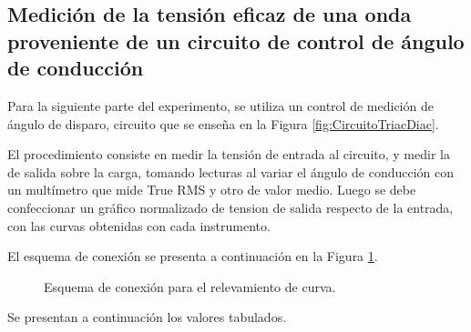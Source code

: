   \subsection{Medición de la tensión eficaz de una onda proveniente de un circuito de control de ángulo de conducción}
Para la siguiente parte del experimento, se utiliza un control de medición 
de ángulo de disparo, circuito que se enseña en la Figura \ref{fig:CircuitoTriacDiac}.



El procedimiento consiste en medir la tensión de entrada al circuito, 
y medir la de salida sobre la carga, tomando lecturas
al variar el ángulo de conducción con un multímetro que mide True RMS y otro de valor medio. 
Luego se debe confeccionar un gráfico normalizado de tension de salida 
respecto de la entrada, con las curvas obtenidas con cada instrumento.

El esquema de conexión se presenta a continuación en la Figura \ref{fig:EsquemaConexionTriac}.

\begin{figure}[H]
  \centering
  \caption{Esquema de conexión para el relevamiento de curva.}
  \label{fig:EsquemaConexionTriac}
\end{figure}

Se presentan a continuación los valores tabulados.

